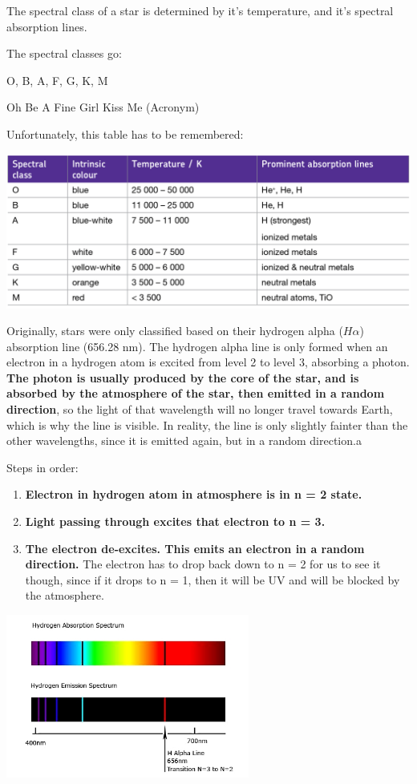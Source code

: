 \documentclass[a4paper, 12pt]{article}
\begin{document}
The spectral class of a star is determined by it's temperature, and it's spectral absorption lines.

The spectral classes go:

O, B, A, F, G, K, M

Oh Be A Fine Girl Kiss Me (Acronym)

Unfortunately, this table has to be remembered:

\includegraphics[width=\textwidth]{images/spectralClasses.png}

Originally, stars were only classified based on their hydrogen alpha ($H \alpha$) absorption line (656.28 nm). The hydrogen alpha line is only formed when an electron in a hydrogen atom is excited from level 2 to level 3, absorbing a photon. \textbf{The photon is usually produced by the core of the star, and is absorbed by the atmosphere of the star, then emitted in a random direction}, so the light of that wavelength will no longer travel towards Earth, which is why the line is visible. In reality, the line is only slightly fainter than the other wavelengths, since it is emitted again, but in a random direction.a

Steps in order:

\begin{enumerate}
\item \textbf{Electron in hydrogen atom in atmosphere is in n = 2 state.}
\item \textbf{Light passing through excites that electron to n = 3.}
\item \textbf{The electron de-excites. This emits an electron in a random direction.} The electron has to drop back down to n = 2 for us to see it though, since if it drops to n = 1, then it will be UV and will be blocked by the atmosphere.
\end{enumerate}

\begin{center}
\includegraphics[width=0.6\textwidth]{images/hydrogenAlpha.jpg}
\end{center}
\end{document}
